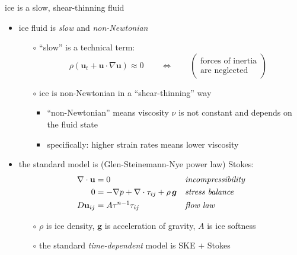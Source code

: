 \documentclass[10pt,dvipsnames]{beamer}
\begin{document}
\begin{frame}{ice is a slow, shear-thinning fluid}

\begin{itemize}
\item ice fluid is \emph{slow} and \emph{non-Newtonian}
    \begin{itemize}
    \item[$\circ$] ``slow'' is a technical term:
      $$\rho \left(\mathbf{u}_t + \mathbf{u}\cdot\nabla \mathbf{u}\right) \approx 0 \qquad \iff \qquad \begin{pmatrix} \text{forces of inertia} \\ \text{are neglected} \end{pmatrix}$$
    \item[$\circ$] ice is non-Newtonian in a ``shear-thinning'' way
        \begin{itemize}
        \item ``non-Newtonian'' means viscosity $\nu$ is not constant and depends on the fluid state
        \item specifically: higher strain rates means lower viscosity
        \end{itemize}
    \end{itemize}

\bigskip
\item the standard model is \alert{(Glen-Steinemann-Nye power law) Stokes}:
\begin{align*}
\nabla \cdot \mathbf{u} &= 0 &&\text{\emph{incompressibility}} \\
0 &= - \nabla p + \nabla \cdot \tau_{ij} + \rho\, \bm{g} &&\text{\emph{stress balance}} \\
D\mathbf{u}_{ij} &= A \tau^{n-1} \tau_{ij} &&\text{\emph{flow law}}
\end{align*}

    \begin{itemize}
    \item[$\circ$] $\rho$ is ice density, $\bm{g}$ is acceleration of gravity, $A$ is ice softness
    \item[$\circ$] the standard \emph{time-dependent} model is \alert{SKE $+$ Stokes}
    \end{itemize}

\end{itemize}
\end{frame}
\end{document}
